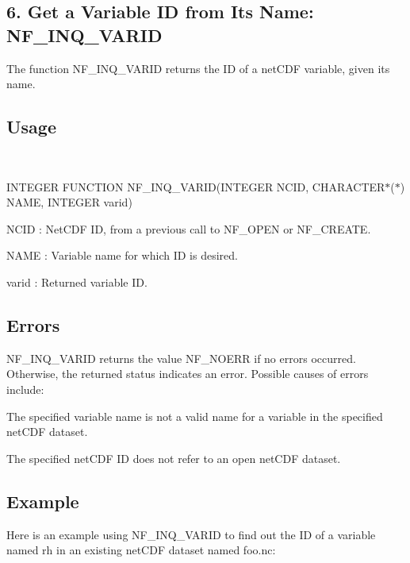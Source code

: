 \subsection*{6. Get a Variable ID from Its Name\+: N\+F\+\_\+\+I\+N\+Q\+\_\+\+V\+A\+R\+ID }

The function N\+F\+\_\+\+I\+N\+Q\+\_\+\+V\+A\+R\+ID returns the ID of a net\+C\+DF variable, given its name.

\subsection*{Usage }

 

I\+N\+T\+E\+G\+ER F\+U\+N\+C\+T\+I\+ON N\+F\+\_\+\+I\+N\+Q\+\_\+\+V\+A\+R\+ID(I\+N\+T\+E\+G\+ER N\+C\+ID, C\+H\+A\+R\+A\+C\+T\+E\+R$\ast$($\ast$) N\+A\+ME, I\+N\+T\+E\+G\+ER varid)

{\ttfamily N\+C\+ID} \+: Net\+C\+DF ID, from a previous call to N\+F\+\_\+\+O\+P\+EN or N\+F\+\_\+\+C\+R\+E\+A\+TE.

{\ttfamily N\+A\+ME} \+: Variable name for which ID is desired.

{\ttfamily varid} \+: Returned variable ID.

\subsection*{Errors }

N\+F\+\_\+\+I\+N\+Q\+\_\+\+V\+A\+R\+ID returns the value N\+F\+\_\+\+N\+O\+E\+RR if no errors occurred. Otherwise, the returned status indicates an error. Possible causes of errors include\+:


\begin{DoxyItemize}
\item The specified variable name is not a valid name for a variable in the specified net\+C\+DF dataset.
\item The specified net\+C\+DF ID does not refer to an open net\+C\+DF dataset.
\end{DoxyItemize}

\subsection*{Example }

Here is an example using N\+F\+\_\+\+I\+N\+Q\+\_\+\+V\+A\+R\+ID to find out the ID of a variable named rh in an existing net\+C\+DF dataset named foo.\+nc\+:

 

